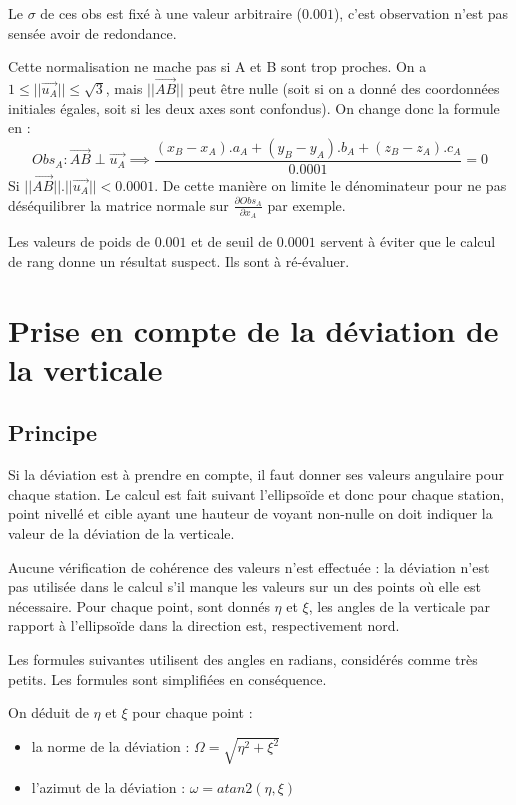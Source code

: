 \documentclass[french]{report}
\begin{document}
Le $\sigma$ de ces obs est fixé à une valeur arbitraire ($0.001$), c'est observation n'est pas sensée avoir de redondance.

Cette normalisation ne mache pas si A et B sont trop proches. On a  $ 1 \leq ||\overrightarrow{u_A}|| \leq \sqrt{3} $, mais $||\overrightarrow{AB}||$ peut être nulle (soit si on a donné des coordonnées initiales égales, soit si les deux axes sont confondus). On change donc la formule en :
$$ Obs_A : \overrightarrow{AB} \perp \overrightarrow{u_A} \implies \frac{(x_B-x_A).a_A + (y_B-y_A).b_A + (z_B-z_A).c_A}{0.0001} = 0 $$
Si $||\overrightarrow{AB}||.||\overrightarrow{u_A}|| < 0.0001$. De cette manière on limite le dénominateur pour ne pas déséquilibrer la matrice normale sur $\frac{\partial{Obs_A}}{\partial{x_A}}$ par exemple.

Les valeurs de poids de $0.001$ et de seuil de $0.0001$ servent à éviter que le calcul de rang donne un résultat suspect. Ils sont à ré-évaluer.



\section{Prise en compte de la déviation de la verticale}
\subsection{Principe}
Si la déviation est à prendre en compte, il faut donner ses valeurs angulaire pour chaque station. Le calcul est fait suivant l'ellipsoïde et donc pour chaque station, point nivellé et cible ayant une hauteur de voyant non-nulle on doit indiquer la valeur de la déviation de la verticale.

Aucune vérification de cohérence des valeurs n'est effectuée : la déviation n'est pas utilisée dans le calcul s'il manque les valeurs sur un des points où elle est nécessaire.
Pour chaque point, sont donnés $\eta$ et $\xi$, les angles de la verticale par rapport à l'ellipsoïde dans la direction est, respectivement nord.

Les formules suivantes utilisent des angles en radians, considérés comme très petits. Les formules sont simplifiées en conséquence.

On déduit de $\eta$ et $\xi$ pour chaque point :
\begin{itemize}
    \item la norme de la déviation : $\Omega = \sqrt{\eta^2 + \xi^2}$
    \item l'azimut de la déviation : $\omega = atan2(\eta,\xi)$
\end{itemize}
\end{document}
